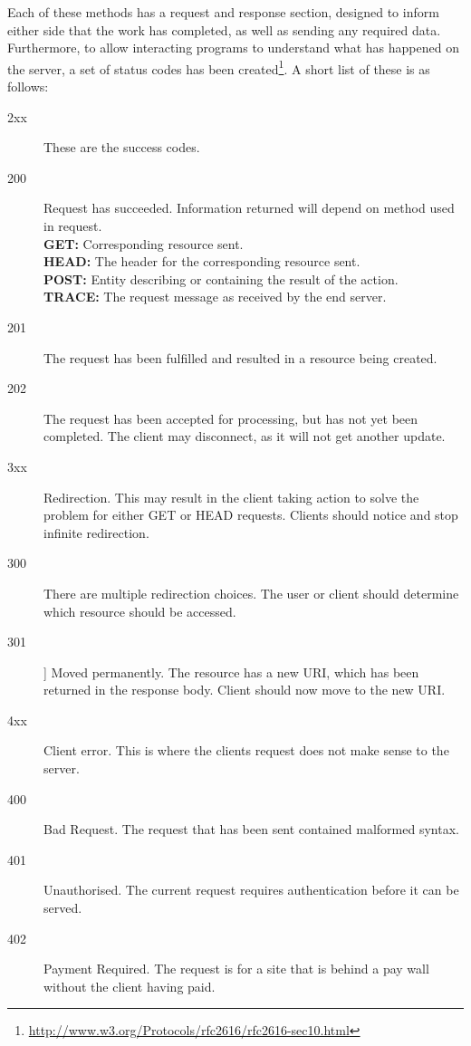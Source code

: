		Each of these methods has a request and response section,
		designed to inform either side that the work has completed, as well as sending any required data.
		Furthermore, to allow interacting programs to understand what has happened on the server,
		a set of status codes has been created\footnote{\url{http://www.w3.org/Protocols/rfc2616/rfc2616-sec10.html}}.
		A short list of these is as follows:
		\begin{description}
			\item[2xx] These are the success codes.
			\item[200] Request has succeeded. Information returned will depend on method used in request. \\
				\textbf{GET:} Corresponding resource sent. \\
				\textbf{HEAD:} The header for the corresponding resource sent. \\
				\textbf{POST:} Entity describing or containing the result of the action. \\
				\textbf{TRACE:} The request message as received by the end server. \\
			\item[201] The request has been fulfilled and resulted in a resource being created.
			\item[202] The request has been accepted for processing, but has not yet been completed.
				The client may disconnect, as it will not get another update.
			\item[3xx] Redirection.
				This may result in the client taking action to solve the problem for either GET or HEAD requests.
				Clients should notice and stop infinite redirection.
			\item[300] There are multiple redirection choices.
				The user or client should determine which resource should be accessed.
			\item[301]] Moved permanently.
				The resource has a new URI, which has been returned in the response body.
				Client should now move to the new URI.
			\item[4xx] Client error.
				This is where the clients request does not make sense to the server.
			\item[400] Bad Request.
				The request that has been sent contained malformed syntax.
			\item[401] Unauthorised.
				The current request requires authentication before it can be served.
			\item[402] Payment Required.
				The request is for a site that is behind a pay wall without the client having paid.

\end{description}
